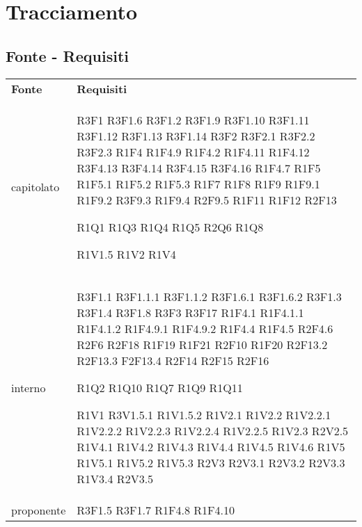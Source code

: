 \section{Tracciamento}
	\subsection{Fonte - Requisiti}
	\begin{longtable} {
		>{\centering}p{28mm}  
		>{}p{20mm}
		}
	\rowcolor{gray!50}
		\textbf{Fonte} & \textbf{Requisiti}	\TBstrut \\
				
		capitolato & 
		R3F1
		R3F1.6
		R3F1.2
		R3F1.9
		R3F1.10
		R3F1.11
		R3F1.12
		R3F1.13
		R3F1.14
		R3F2
		R3F2.1
		R3F2.2
		R3F2.3
		R1F4
		R1F4.9
		R1F4.2
		R1F4.11
		R1F4.12
		R3F4.13
		R3F4.14
		R3F4.15
		R3F4.16
		R1F4.7
		R1F5
		R1F5.1
		R1F5.2
		R1F5.3
		R1F7
		R1F8
		R1F9
		R1F9.1
		R1F9.2
		R3F9.3
		R1F9.4
		R2F9.5
		R1F11
		R1F12
		R2F13

		R1Q1 
		R1Q3 
		R1Q4 
		R1Q5 
		R2Q6
		R1Q8
		 
		R1V1.5
		R1V2
		R1V4 \TBstrut \\ [2mm]
				
		interno & 
		R3F1.1
		R3F1.1.1
		R3F1.1.2
		R3F1.6.1
		R3F1.6.2
		R3F1.3
		R3F1.4
		R3F1.8
		R3F3
		R3F17
		R1F4.1
		R1F4.1.1
		R1F4.1.2
		R1F4.9.1
		R1F4.9.2
		R1F4.4
		R1F4.5
		R2F4.6
		R2F6
		R2F18
		R1F19
		R1F21
		R2F10
		R1F20
		R2F13.2
		R2F13.3
		F2F13.4
		R2F14
		R2F15
		R2F16
		
		R1Q2 
		R1Q10
		R1Q7
		R1Q9
		R1Q11
		
		R1V1
		R3V1.5.1
		R1V1.5.2 
		R1V2.1 
		R1V2.2 
		R1V2.2.1 
		R1V2.2.2 
		R1V2.2.3 
		R1V2.2.4 
		R1V2.2.5 
		R1V2.3 
		R2V2.5 
		R1V4.1
		R1V4.2
		R1V4.3
		R1V4.4
		R1V4.5
		R1V4.6
		R1V5
		R1V5.1
		R1V5.2
		R1V5.3
		R2V3 
		R2V3.1 
		R2V3.2 
		R2V3.3
		R1V3.4
		R2V3.5 \TBstrut \\ [2mm]

		proponente &
		R3F1.5
		R3F1.7
		R1F4.8
		R1F4.10 \TBstrut \\ [2mm]
				

\end{longtable}
